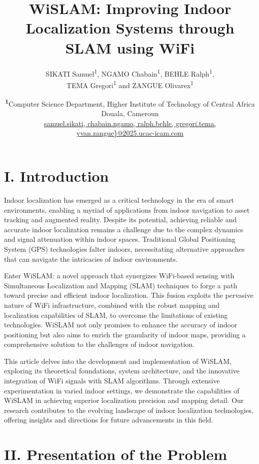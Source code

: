 \documentclass[
	a4paper, %
	11pt, %
	unnumberedsections, %
	twoside, %
]{LTJournalArticle}
\title{WiSLAM: Improving Indoor Localization Systems through SLAM using WiFi\\} %
\author{%
	SIKATI Samuel\textsuperscript{1}, NGAMO Chabain\textsuperscript{1}, BEHLE Ralph\textsuperscript{1}, \\ TEMA Gregori\textsuperscript{1} and ZANGUE Olivarex\textsuperscript{1}
}
\date{\footnotesize\textsuperscript{\textbf{1}}Computer Science Department, Higher Institute of Technology of Central Africa \\ Douala, Cameroun\\
\href{mailto:samuel.sikati@2025.ucac-icam.com,chabain.ngamo@2025.ucac-icam.com,ralph.behle@2025.ucac-icam.com,gregori.tema@2025.ucac-icam.com,yvan.zangue@2025.ucac-icam.com}{{samuel.sikati, chabain.ngamo, ralph.behle, gregori.tema, yvan.zangue\}@2025.ucac-icam.com} }}
\begin{document}
\maketitle %


\section{I.	Introduction}

Indoor localization has emerged as a critical technology in the era of smart environments, enabling a myriad of applications from indoor navigation to asset tracking and augmented reality. Despite its potential, achieving reliable and accurate indoor localization remains a challenge due to the complex dynamics and signal attenuation within indoor spaces. Traditional Global Positioning System (GPS) technologies falter indoors, necessitating alternative approaches that can navigate the intricacies of indoor environments.

Enter WiSLAM: a novel approach that synergizes WiFi-based sensing with Simultaneous Localization and Mapping (SLAM) techniques to forge a path toward precise and efficient indoor localization. This fusion exploits the pervasive nature of WiFi infrastructure, combined with the robust mapping and localization capabilities of SLAM, to overcome the limitations of existing technologies. WiSLAM not only promises to enhance the accuracy of indoor positioning but also aims to enrich the granularity of indoor maps, providing a comprehensive solution to the challenges of indoor navigation.

This article delves into the development and implementation of WiSLAM, exploring its theoretical foundations, system architecture, and the innovative integration of WiFi signals with SLAM algorithms. Through extensive experimentation in varied indoor settings, we demonstrate the capabilities of WiSLAM in achieving superior localization precision and mapping detail. Our research contributes to the evolving landscape of indoor localization technologies, offering insights and directions for future advancements in this field.

\section{II.	Presentation of the Problem}
\end{document}
